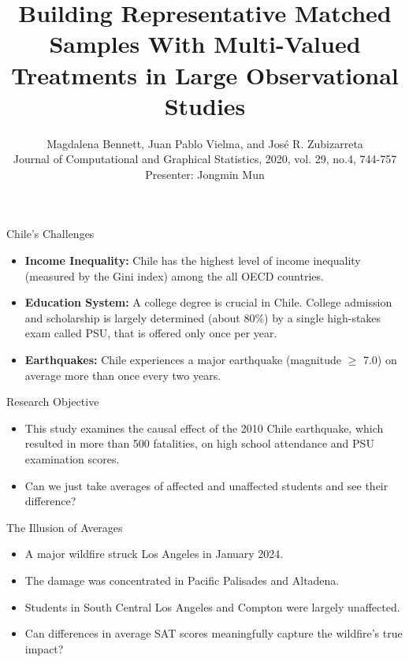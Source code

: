 \documentclass{beamer}
\title[Representative Matched Samples]{Building Representative Matched Samples With Multi-Valued Treatments in Large Observational Studies}
\author[Bennett, Vielma, Zubizarreta]{Magdalena Bennett, Juan Pablo Vielma, and Jos\'e R. Zubizarreta
\\
Journal of Computational and Graphical Statistics, 2020, vol. 29, no.4, 744-757
\\ Presenter: Jongmin Mun
}
\date{}
\begin{document}
\begin{frame}
  \titlepage
  \centering
\end{frame}

\begin{frame}{Chile's Challenges}
  \begin{itemize}
 
    
    \item \textbf{Income Inequality:}  
    Chile has the highest level of income inequality (measured by the Gini index) among the all OECD countries.
    
    \item \textbf{Education System:}  
    A college degree is crucial in Chile. College admission and scholarship is largely determined (about 80\%) by a single high-stakes exam called PSU, that is offered only once per year.
    
       \item \textbf{Earthquakes:}  
    Chile experiences a major earthquake (magnitude $\ge$ 7.0) on average more than once every two years.
  \end{itemize}
\end{frame}

\begin{frame}{Research Objective}
\begin{itemize}
	\item This study examines the causal effect of the 2010 Chile earthquake, which resulted in more than 500 fatalities, on high school attendance and PSU examination scores.
	\item Can we just take averages of affected and unaffected students and see their difference?
\end{itemize}

\end{frame}

\begin{frame}{The Illusion of Averages}

\begin{itemize}
    \item A major wildfire struck Los Angeles in January 2024.
    \item The damage was concentrated in Pacific Palisades and Altadena.
    \item Students in South Central Los Angeles and Compton were largely unaffected.
    \item Can differences in average SAT scores meaningfully capture the wildfire’s true impact?
\end{itemize}

\end{frame}
\end{document}
